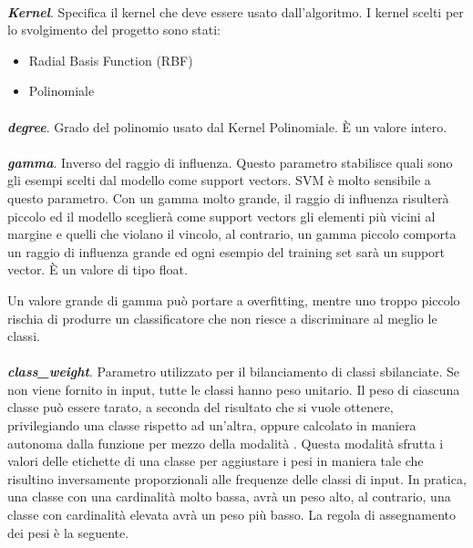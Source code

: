 \documentclass[12pt,a4paper,oneside,hidelinks]{report}
\begin{document}
\paragraph*{}
\textbf{\textit{Kernel}}. Specifica il kernel che deve essere usato dall'algoritmo. I kernel scelti per lo svolgimento del progetto sono stati:

\begin{itemize}
    \item Radial Basis Function (RBF) 
    \item Polinomiale
\end{itemize}

\paragraph*{}
\textbf{\textit{degree}}. Grado del polinomio usato dal Kernel Polinomiale. È un valore intero.

\paragraph*{}
\textbf{\textit{gamma}}. Inverso del raggio di influenza. Questo parametro stabilisce quali sono gli esempi scelti dal modello come support vectors. SVM è molto sensibile a questo parametro. Con un gamma molto grande, il raggio di influenza risulterà piccolo ed il modello sceglierà come support vectors gli elementi più vicini al margine e quelli che violano il vincolo, al contrario, un gamma piccolo comporta un raggio di influenza grande ed ogni esempio del training set sarà un support vector. È un valore di tipo float.

Un valore grande di gamma può portare a overfitting, mentre uno troppo piccolo rischia di produrre un classificatore che non riesce a discriminare al meglio le classi.

\paragraph*{}
\textbf{\textit{class\_weight}}. Parametro utilizzato per il bilanciamento di classi sbilanciate. Se non viene fornito in input, tutte le classi hanno peso unitario. Il peso di ciascuna classe può essere tarato, a seconda del risultato che si vuole ottenere, privilegiando una classe rispetto ad un'altra, oppure calcolato in maniera autonoma dalla funzione per mezzo della modalità . 
Questa modalità sfrutta i valori delle etichette di una classe per aggiustare i pesi in maniera tale che risultino inversamente proporzionali alle frequenze delle classi di input. In pratica, una classe con una cardinalità molto bassa, avrà un peso alto, al contrario, una classe con cardinalità elevata avrà un peso più basso. La regola di assegnamento dei pesi è la seguente.
\end{document}
